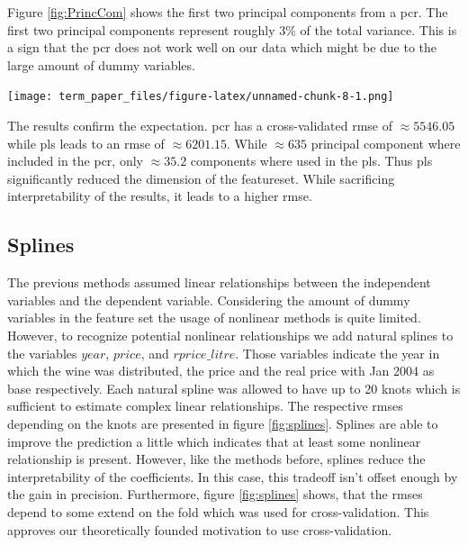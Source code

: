 \documentclass[11pt,]{article}
\let\origfigure\figure
\let\endorigfigure\endfigure
\renewenvironment{figure}[1][2] {
    \expandafter\origfigure\expandafter[H]
} {
    \endorigfigure
}
\begin{document}
Figure \ref{fig:PrincCom} shows the first two principal components from
a \ac{pcr}. The first two principal components represent roughly 3\% of
the total variance. This is a sign that the \ac{pcr} does not work well
on our data which might be due to the large amount of dummy variables.

\begin{figure}
\centering
\texttt{[image: term\_paper\_files/figure-latex/unnamed-chunk-8-1.png]}
\caption{\label{fig:PrincCom}Principal Component One and Two.}
\end{figure}

The results confirm the expectation. \ac{pcr} has a cross-validated
\ac{rmse} of \(\approx 5546.05\) while \ac{pls} leads to an \ac{rmse} of
\(\approx 6201.15\). While \(\approx 635\) principal component where
included in the \ac{pcr}, only \(\approx 35.2\) components where used in
the \ac{pls}. Thus \ac{pls} significantly reduced the dimension of the
featureset. While sacrificing interpretability of the results, it leads
to a higher \ac{rmse}.

\hypertarget{splines}{%
\subsection{Splines}\label{splines}}

The previous methods assumed linear relationships between the
independent variables and the dependent variable. Considering the amount
of dummy variables in the feature set the usage of nonlinear methods is
quite limited. However, to recognize potential nonlinear relationships
we add natural splines to the variables \(year\), \(price\), and
\(rprice\_litre\). Those variables indicate the year in which the wine
was distributed, the price and the real price with Jan 2004 as base
respectively. Each natural spline was allowed to have up to 20 knots
which is sufficient to estimate complex linear relationships. The
respective \ac{rmse}s depending on the knots are presented in figure
\ref{fig:splines}. Splines are able to improve the prediction a little
which indicates that at least some nonlinear relationship is present.
However, like the methods before, splines reduce the interpretability of
the coefficients. In this case, this tradeoff isn't offset enough by the
gain in precision. Furthermore, figure \ref{fig:splines} shows, that the
\ac{rmse}s depend to some extend on the fold which was used for
cross-validation. This approves our theoretically founded motivation to
use cross-validation.
\end{document}

